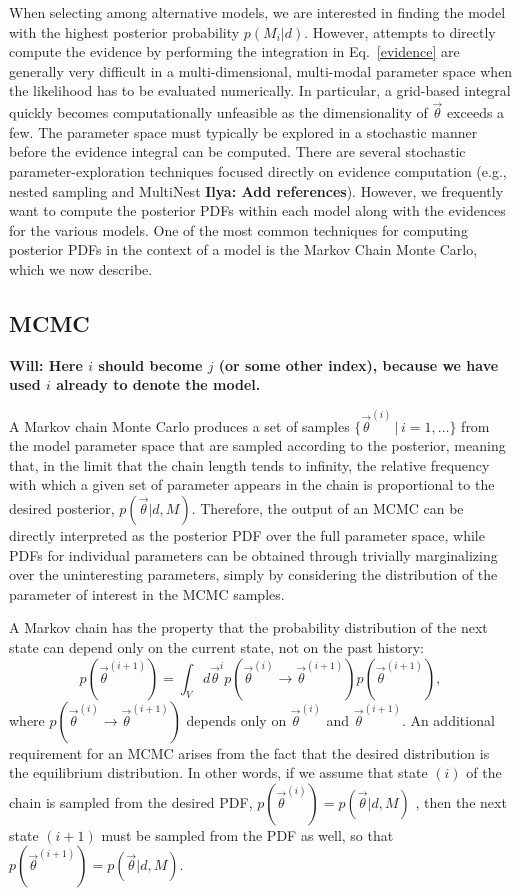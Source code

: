 \documentclass[prd,preprint]{revtex4}
\newcommand{\vtheta}{\vec{\theta}}
\newcommand{\be}{\begin{equation}}
\newcommand{\ee}{\end{equation}}
\newcommand{\ilya}[1]{{\color{red} \bf Ilya: #1}}
\newcommand{\will}[1]{{\color{blue} \bf Will: #1}}
\begin{document}
When selecting among alternative models, we are interested in finding
the model with the highest posterior probability $p(M_i|d)$.  However,
attempts to directly compute the evidence by performing the
integration in Eq.~\eqref{evidence} are generally very difficult in a
multi-dimensional, multi-modal parameter space when the likelihood has
to be evaluated numerically.  In particular, a grid-based integral
quickly becomes computationally unfeasible as the dimensionality of
$\vtheta$ exceeds a few.  The parameter space must typically be
explored in a stochastic manner before the evidence integral can be
computed.  There are several stochastic parameter-exploration
techniques focused directly on evidence computation (e.g., nested
sampling and MultiNest \ilya {Add references}).  However, we
frequently want to compute the posterior PDFs within each model along
with the evidences for the various models.  One of the most common
techniques for computing posterior PDFs in the context of a model is
the Markov Chain Monte Carlo, which we now describe.

\subsection{MCMC} \label{sec:mcmc}

\will{Here $i$ should become $j$ (or some other index), because we
  have used $i$ already to denote the model.}

A Markov chain Monte Carlo produces a set of samples $\{ \vtheta^{(i)} \, | \, i = 1, \ldots \}$ from the model parameter space that are sampled according to the posterior, meaning that, in the limit that the chain length tends to infinity, the relative frequency with which a given set of parameter appears in the chain is proportional to the desired posterior, $p(\vtheta|d,M)$.  Therefore, the output of an MCMC can be directly interpreted as the posterior PDF over the full parameter space, while PDFs for individual parameters can be obtained through trivially marginalizing over the uninteresting parameters, simply by considering the distribution of the parameter of interest in the MCMC samples.

A Markov chain has the property that the probability distribution of the next state can depend only on the current state, not on the past history:
\be
p(\vtheta^{(i+1)})=\int_{V} d\vtheta^{i} p(\vtheta^{(i)} \to \vtheta^{(i+1)}) p(\vtheta^{(i+1)}),
\ee
where $p(\vtheta^{(i)} \to \vtheta^{(i+1)})$ depends only on $\vtheta^{(i)}$ and $\vtheta^{(i+1)}$. 
An additional requirement for an MCMC arises from the fact that the desired distribution is the equilibrium distribution.  In other words, if we assume that state $(i)$ of the chain is sampled from the desired PDF, $p(\vtheta^{(i)})=p(\vtheta|d,M)$ , then the next state $(i+1)$ must be sampled from the PDF as well, so that $p(\vtheta^{(i+1)})=p(\vtheta|d,M)$.  
\end{document}
